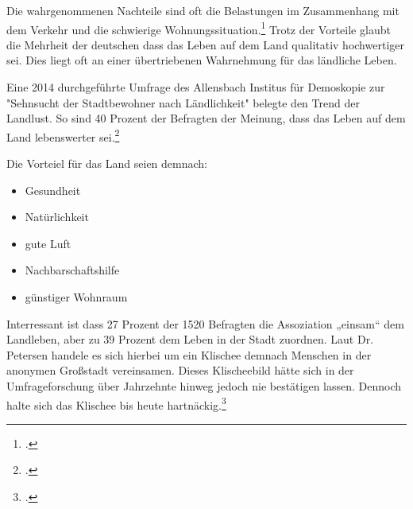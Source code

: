 \documentclass{scrartcl}
\begin{document}
Die wahrgenommenen Nachteile sind oft die Belastungen im Zusammenhang mit dem Verkehr und die schwierige Wohnungssituation.\footcite[S. 41]{Egnolff2015DieIdeal} Trotz der Vorteile glaubt die Mehrheit der deutschen dass das Leben auf dem Land qualitativ hochwertiger sei. Dies liegt oft an einer übertriebenen Wahrnehmung für das ländliche Leben.

Eine 2014 durchgeführte Umfrage des Allensbach Institus für Demoskopie zur "Sehnsucht der Stadtbewohner nach Ländlichkeit" belegte den Trend der Landlust. So sind 40 Prozent der Befragten der Meinung, dass das Leben auf dem Land lebenswerter sei.\footcite[Vgl.][S. 15 Abb.2]{Dr.ThomasPetersen2014DieLandlichkeit}


Die Vorteiel für das Land seien demnach:

\begin{itemize}
    \item Gesundheit
    \item Natürlichkeit
    \item gute Luft
    \item Nachbarschaftshilfe
    \item günstiger Wohnraum
\end{itemize}

Interressant ist dass 27 Prozent der 1520 Befragten die Assoziation „einsam“ dem Landleben, aber zu 39 Prozent dem Leben in der Stadt zuordnen. Laut Dr. Petersen handele es sich hierbei um ein Klischee demnach Menschen in der anonymen Großstadt vereinsamen. Dieses Klischeebild hätte sich in der Umfrageforschung über Jahrzehnte hinweg jedoch nie bestätigen lassen. Dennoch halte sich das Klischee bis heute hartnäckig.\footcite[Vgl.][S. 7ff]{Dr.ThomasPetersen2014DieLandlichkeit}
\end{document}
